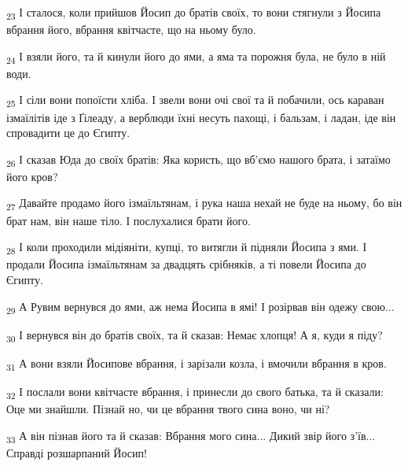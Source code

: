 \begin{tcolorbox}
\textsubscript{23} І сталося, коли прийшов Йосип до братів своїх, то вони стягнули з Йосипа вбрання його, вбрання квітчасте, що на ньому було.
\end{tcolorbox}
\begin{tcolorbox}
\textsubscript{24} І взяли його, та й кинули його до ями, а яма та порожня була, не було в ній води.
\end{tcolorbox}
\begin{tcolorbox}
\textsubscript{25} І сіли вони попоїсти хліба. І звели вони очі свої та й побачили, ось караван ізмаїлітів іде з Ґілеаду, а верблюди їхні несуть пахощі, і бальзам, і ладан, іде він спровадити це до Єгипту.
\end{tcolorbox}
\begin{tcolorbox}
\textsubscript{26} І сказав Юда до своїх братів: Яка користь, що вб'ємо нашого брата, і затаїмо його кров?
\end{tcolorbox}
\begin{tcolorbox}
\textsubscript{27} Давайте продамо його ізмаїльтянам, і рука наша нехай не буде на ньому, бо він брат нам, він наше тіло. І послухалися брати його.
\end{tcolorbox}
\begin{tcolorbox}
\textsubscript{28} І коли проходили мідіяніти, купці, то витягли й підняли Йосипа з ями. І продали Йосипа ізмаїльтянам за двадцять срібняків, а ті повели Йосипа до Єгипту.
\end{tcolorbox}
\begin{tcolorbox}
\textsubscript{29} А Рувим вернувся до ями, аж нема Йосипа в ямі! І розірвав він одежу свою...
\end{tcolorbox}
\begin{tcolorbox}
\textsubscript{30} І вернувся він до братів своїх, та й сказав: Немає хлопця! А я, куди я піду?
\end{tcolorbox}
\begin{tcolorbox}
\textsubscript{31} А вони взяли Йосипове вбрання, і зарізали козла, і вмочили вбрання в кров.
\end{tcolorbox}
\begin{tcolorbox}
\textsubscript{32} І послали вони квітчасте вбрання, і принесли до свого батька, та й сказали: Оце ми знайшли. Пізнай но, чи це вбрання твого сина воно, чи ні?
\end{tcolorbox}
\begin{tcolorbox}
\textsubscript{33} А він пізнав його та й сказав: Вбрання мого сина... Дикий звір його з'їв... Справді розшарпаний Йосип!
\end{tcolorbox}
